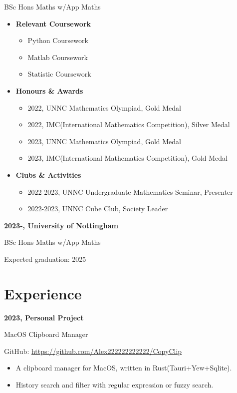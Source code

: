 \documentclass{article}
\begin{document}
    \noindent BSc Hons Maths w/App Maths
    \begin{itemize}
        \item \textbf{Relevant Coursework}
        \begin{itemize}
            \item Python Coursework
            \item Matlab Coursework
            \item Statistic Coursework
        \end{itemize}
        \item \textbf{Honours \& Awards}
        \begin{itemize}
            \item 2022, UNNC Mathematics Olympiad, Gold Medal
            \item 2022, IMC(International Mathematics Competition), Silver Medal
            \item 2023, UNNC Mathematics Olympiad, Gold Medal
            \item 2023, IMC(International Mathematics Competition), Gold Medal
        \end{itemize}
        \item \textbf{Clubs \& Activities}
        \begin{itemize}
            \item 2022-2023, UNNC Undergraduate Mathematics Seminar, Presenter
            \item 2022-2023, UNNC Cube Club, Society Leader
        \end{itemize}
    \end{itemize}

    \noindent\textbf{2023-, University of Nottingham}

    \noindent BSc Hons Maths w/App Maths

    \noindent Expected graduation: 2025

\section*{Experience}
    \noindent\textbf{2023, Personal Project}

    \noindent MacOS Clipboard Manager

    \noindent GitHub: \href{https://github.com/Alex222222222222/CopyClip}{https://github.com/Alex222222222222/CopyClip}
    \begin{itemize}
        \item A clipboard manager for MacOS, written in Rust(Tauri+Yew+Sqlite).
        \item History search and filter with regular expression or fuzzy search.
    \end{itemize}
\end{document}
